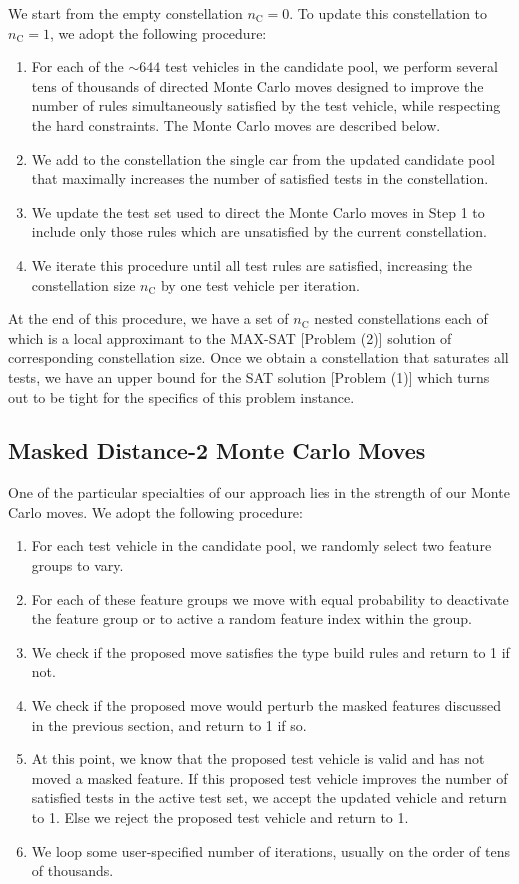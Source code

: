 \documentclass[aps,pra,twocolumn,superscriptaddress,groupedaddress]{revtex4}  %
\begin{document}
We start from the empty constellation $n_{\mathrm{C}} = 0$. To update this
constellation to $n_{\mathrm{C}} = 1$, we adopt the following procedure:
\begin{enumerate}
\item For each of the $\sim 644$ test vehicles in the candidate pool, we
perform several tens of thousands of directed Monte Carlo moves designed to
improve the number of rules simultaneously satisfied by the test vehicle, while
respecting the hard constraints. The Monte Carlo moves are described below.
\item We add to the constellation the single car from the updated candidate pool
that maximally increases the number of satisfied tests in the constellation.
\item We update the test set used to direct the Monte Carlo moves in Step 1 to
include only those rules which are unsatisfied by the current constellation.
\item We iterate this procedure until all test rules are satisfied, increasing
the constellation size $n_{\mathrm{C}}$ by one test vehicle per iteration.
\end{enumerate}
At the end of this procedure, we have a set of $n_{\mathrm{C}}$ nested
constellations each of which is a local approximant to the MAX-SAT [Problem (2)]
solution of corresponding constellation size. Once we obtain a constellation
that saturates all tests, we have an upper bound for the SAT solution [Problem
(1)] which turns out to be tight for the specifics of this problem instance.

\subsection{Masked Distance-2 Monte Carlo Moves}

One of the particular specialties of our approach lies in the strength of our
Monte Carlo moves. We adopt the following procedure:
\begin{enumerate}
\item For each test vehicle in the candidate pool, we randomly select two
feature groups to vary.
\item For each of these feature groups we move with equal probability to
deactivate the feature group or to active a random feature index within the
group.
\item We check if the proposed move satisfies the type build rules and return to
1 if not.
\item We check if the proposed move would perturb the masked features discussed
in the previous section, and return to 1 if so. 
\item At this point, we know that the proposed test vehicle is valid and has not
moved a masked feature. If this proposed test vehicle improves the number of
satisfied tests in the active test set, we accept the updated vehicle and return
to 1. Else we reject the proposed test vehicle and return to 1.
\item We loop some user-specified number of iterations, usually on the order of
tens of thousands.
\end{enumerate}
\end{document}
